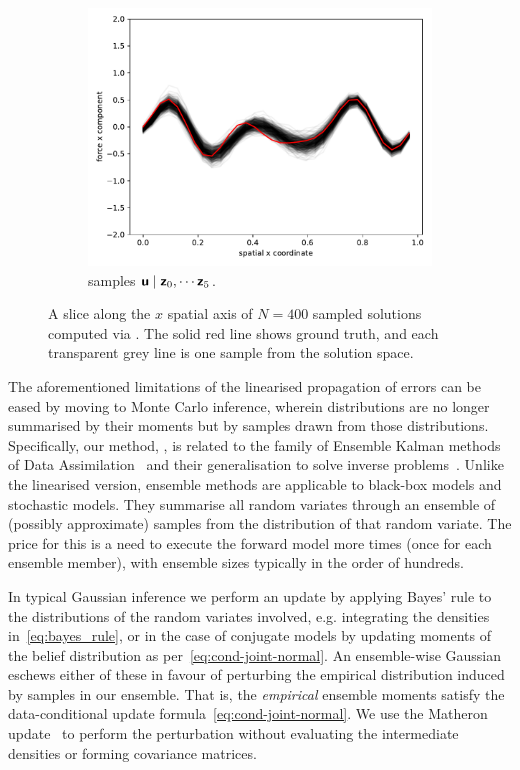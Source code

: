 \documentclass{article}
\theoremstyle{plain}
\theoremstyle{definition}
\theoremstyle{remark}
\begin{document}
\begin{figure}[h!t]
\begin{subfigure}{0.3\textwidth}
        \includegraphics[scale=0.35]{meth_ex_guess_4.pdf}
         \caption{\meth{} samples \(\boldsymbol{\mathsf{u}}\mid \boldsymbol{\mathsf{z}}_0,\cdots\boldsymbol{\mathsf{z}}_5\).}
         \label{fig:meth_ex_4}
     \end{subfigure}
     \hfill
    \centering
    \caption{A slice along the \(x\) spatial  axis of  \(N=400\) sampled solutions computed via \meth{}. The solid red line shows ground truth, and each transparent grey line is one sample from the solution space.}
    \label{fig:inverse-slices}
\end{figure}


The aforementioned limitations of the linearised propagation of errors can be eased by moving to Monte Carlo inference, wherein distributions are no longer summarised by their moments but  by samples drawn from those distributions.
Specifically, our method, \meth, is related to the family of Ensemble Kalman methods of Data Assimilation~\cite{EvensenData2009} and their generalisation to solve inverse problems~\cite{IglesiasEnsemble2013}.
Unlike the linearised version, ensemble methods are applicable to black-box models and stochastic models.  They summarise all random variates through an ensemble of (possibly approximate) samples from the distribution of that random variate.
The price for this is a need to execute the forward model more times (once for each ensemble member), with ensemble sizes typically in the order of hundreds.

In typical Gaussian inference we perform  an update by applying Bayes' rule to the distributions of the random variates involved, e.g. integrating the densities in~\eqref{eq:bayes_rule}, or in the case of conjugate models by updating moments of the belief distribution as per~\eqref{eq:cond-joint-normal}.
An ensemble-wise Gaussian eschews either of these in favour of perturbing the empirical distribution induced by samples in our ensemble.
That is, the \emph{empirical} ensemble moments satisfy the data-conditional update formula~\eqref{eq:cond-joint-normal}.
We use the Matheron update~\citep{WilsonPathwise2021} to perform the perturbation without evaluating the intermediate densities or forming covariance matrices.
\end{document}
